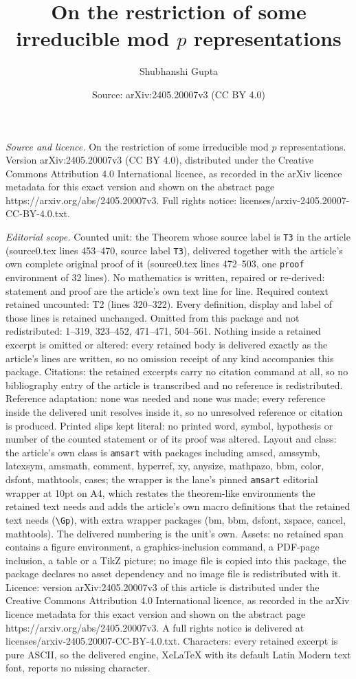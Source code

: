 \documentclass[10pt,a4paper]{amsart}
\title[On the restriction of some irreducible mod $p$ representatio]{On the restriction of some irreducible mod $p$ representations}
\author{Shubhanshi Gupta}
\date{Source: arXiv:2405.20007v3 (CC BY 4.0)}
\begin{document}
\maketitle

\noindent\emph{Source and licence.} On the restriction of some irreducible mod $p$ representations. Version arXiv:2405.20007v3 (CC BY 4.0), distributed under the Creative Commons Attribution 4.0 International licence, as recorded in the arXiv licence metadata for this exact version and shown on the abstract page https://arxiv.org/abs/2405.20007v3. Full rights notice: licenses/arxiv-2405.20007-CC-BY-4.0.txt.\par\smallskip

\noindent\textit{Editorial scope.} Counted unit: the Theorem whose source label is \texttt{T3} in the article (source0.tex lines 453--470, source label \texttt{T3}), delivered together with the article's own complete original proof of it (source0.tex lines 472--503, one \texttt{proof} environment of 32 lines). No mathematics is written, repaired or re-derived: statement and proof are the article's own text line for line. Required context retained uncounted: T2 (lines 320--322). Every definition, display and label of those lines is retained unchanged. Omitted from this package and not redistributed: 1--319, 323--452, 471--471, 504--561. Nothing inside a retained excerpt is omitted or altered: every retained body is delivered exactly as the article's lines are written, so no omission receipt of any kind accompanies this package. Citations: the retained excerpts carry no citation command at all, so no bibliography entry of the article is transcribed and no reference is redistributed. Reference adaptation: none was needed and none was made; every reference inside the delivered unit resolves inside it, so no unresolved reference or citation is produced. Printed slips kept literal: no printed word, symbol, hypothesis or number of the counted statement or of its proof was altered. Layout and class: the article's own class is \texttt{amsart} with packages including amscd, amssymb, latexsym, amsmath, comment, hyperref, xy, anysize, mathpazo, bbm, color, dsfont, mathtools, cases; the wrapper is the lane's pinned \texttt{amsart} editorial wrapper at 10pt on A4, which restates the theorem-like environments the retained text needs and adds the article's own macro definitions that the retained text needs (\texttt{\textbackslash Gp}), with extra wrapper packages (bm, bbm, dsfont, xspace, cancel, mathtools). The delivered numbering is the unit's own. Assets: no retained span contains a figure environment, a graphics-inclusion command, a PDF-page inclusion, a table or a TikZ picture; no image file is copied into this package, the package declares no asset dependency and no image file is redistributed with it. Licence: version arXiv:2405.20007v3 of this article is distributed under the Creative Commons Attribution 4.0 International licence, as recorded in the arXiv licence metadata for this exact version and shown on the abstract page https://arxiv.org/abs/2405.20007v3. A full rights notice is delivered at licenses/arxiv-2405.20007-CC-BY-4.0.txt. Characters: every retained excerpt is pure ASCII, so the delivered engine, XeLaTeX with its default Latin Modern text font, reports no missing character.
\end{document}

